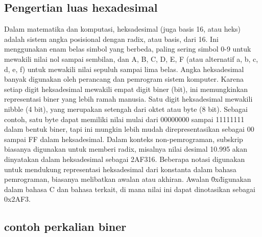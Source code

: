 \subsection{Pengertian luas hexadesimal}
Dalam matematika dan komputasi, heksadesimal (juga basis 16, atau heks) adalah sistem angka posisional dengan radix, atau basis, dari 16. Ini 
menggunakan enam belas simbol yang berbeda, paling sering simbol 0-9 untuk mewakili nilai nol sampai sembilan, dan A, B, C, D, E, F (atau 
alternatif a, b, c, d, e, f) untuk mewakili nilai sepuluh sampai lima belas. Angka heksadesimal banyak digunakan oleh perancang dan pemrogram 
sistem komputer. Karena setiap digit heksadesimal mewakili empat digit biner (bit), ini memungkinkan representasi biner yang lebih ramah manusia. 
Satu digit heksadesimal mewakili nibble (4 bit), yang merupakan setengah dari oktet atau byte (8 bit). Sebagai contoh, satu byte dapat memiliki 
nilai mulai dari 00000000 sampai 11111111 dalam bentuk biner, tapi ini mungkin lebih mudah direpresentasikan sebagai 00 sampai FF dalam heksadesimal.
Dalam konteks non-pemrograman, subskrip biasanya digunakan untuk memberi radix, misalnya nilai desimal 10.995 akan dinyatakan dalam heksadesimal 
sebagai 2AF316. Beberapa notasi digunakan untuk mendukung representasi heksadesimal dari konstanta dalam bahasa pemrograman, biasanya melibatkan 
awalan atau akhiran. Awalan \"0x\" digunakan dalam bahasa C dan bahasa terkait, di mana nilai ini dapat dinotasikan sebagai 0x2AF3.

\subsection {contoh perkalian biner}

